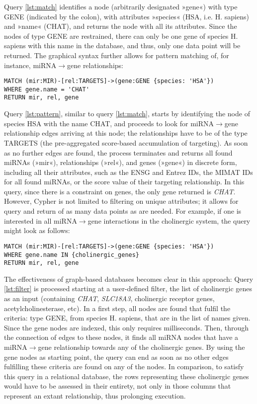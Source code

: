 Query \ref{lst:match} identifies a node (arbitrarily designated »gene«) with type GENE (indicated by the colon), with attributes »species« (HSA, i.e. H. sapiens) and »name« (CHAT), and returns the node with all its attributes. Since the nodes of type GENE are restrained, there can only be one gene of species H. sapiens with this name in the database, and thus, only one data point will be returned. The graphical syntax further allows for pattern matching of, for instance, miRNA$\to$gene relationships:

\begin{lstlisting}[label=lst:pattern,caption=Patterns,
language=Cypher]
MATCH (mir:MIR)-[rel:TARGETS]->(gene:GENE {species: 'HSA'})
WHERE gene.name = 'CHAT'
RETURN mir, rel, gene
\end{lstlisting}

Query \ref{lst:pattern}, similar to query \ref{lst:match}, starts by identifying the node of species HSA with the name CHAT, and proceeds to look for miRNA$\to$gene relationship edges arriving at this node; the relationships have to be of the type TARGETS (the pre-aggregated score-based accumulation of targeting). As soon as no further edges are found, the process terminates and returns all found miRNAs (»mir«), relationships (»rel«), and genes (»gene«) in discrete form, including all their attributes, such as the ENSG and Entrez IDs, the MIMAT IDs for all found miRNAs, or the score value of their targeting relationship. In this query, since there is a constraint on genes, the only gene returned is \textit{CHAT}. However, Cypher is not limited to filtering on unique attributes; it allows for query and return of as many data points as are needed. For example, if one is interested in all miRNA$\to$gene interactions in the cholinergic system, the query might look as follows:

\begin{lstlisting}[label=lst:filter,caption=Filtering,
language=Cypher]
MATCH (mir:MIR)-[rel:TARGETS]->(gene:GENE {species: 'HSA'})
WHERE gene.name IN {cholinergic_genes}
RETURN mir, rel, gene
\end{lstlisting}

The effectiveness of graph-based databases becomes clear in this approach: Query \ref{lst:filter} is processed starting at a user-defined filter, the list of cholinergic genes as an input (containing \textit{CHAT}, \textit{SLC18A3}, cholinergic receptor genes, acetylcholinesterase, etc). In a first step, all nodes are found that fulfil the criteria: type GENE, from species H. sapiens, that are in the list of names given. Since the gene nodes are indexed, this only requires milliseconds. Then, through the connection of edges to these nodes, it finds all miRNA nodes that have a miRNA$\to$gene relationship towards any of the cholinergic genes. By using the gene nodes as starting point, the query can end as soon as no other edges fulfilling these criteria are found on any of the nodes. In comparison, to satisfy this query in a relational database, the rows representing these cholinergic genes would have to be assessed in their entirety, not only in those columns that represent an extant relationship, thus prolonging execution.

